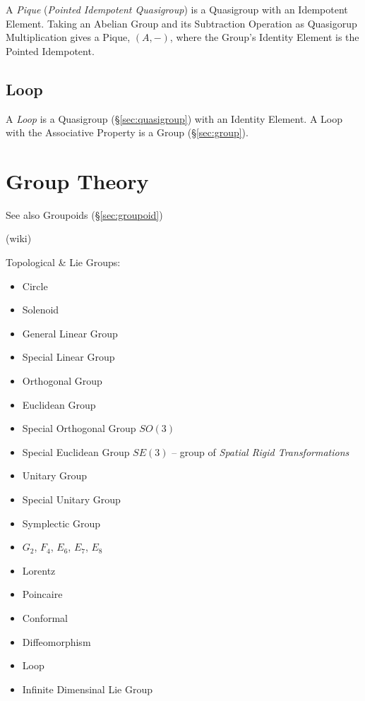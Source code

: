 A \emph{Pique} (\emph{Pointed Idempotent Quasigroup}) is a Quasigroup
with an Idempotent Element. Taking an Abelian Group and its
Subtraction Operation as Quasigorup Multiplication gives a Pique,
$(A,-)$, where the Group's Identity Element is the Pointed Idempotent.



\subsection{Loop}\label{sec:quasigroup_loop}

A \emph{Loop} is a Quasigroup (\S\ref{sec:quasigroup}) with an
Identity Element. A Loop with the Associative Property is a Group
(\S\ref{sec:group}).



\section{Group Theory}\label{sec:group_theory}

\fist See also Groupoids (\S\ref{sec:groupoid})

(wiki)

Topological & Lie Groups:
\begin{itemize}
  \item Circle
  \item Solenoid
  \item General Linear Group
  \item Special Linear Group
  \item Orthogonal Group
  \item Euclidean Group
  \item Special Orthogonal Group $SO(3)$
  \item Special Euclidean Group $SE(3)$ -- group of \emph{Spatial Rigid
    Transformations}
  \item Unitary Group
  \item Special Unitary Group
  \item Symplectic Group
  \item $G_2$, $F_4$, $E_6$, $E_7$, $E_8$
  \item Lorentz
  \item Poincaire
  \item Conformal
  \item Diffeomorphism
  \item Loop
  \item Infinite Dimensinal Lie Group
\end{itemize}

